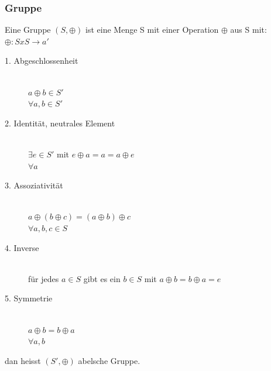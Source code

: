 \documentclass[a4paper,10pt]{article}
\newcommand{\ra}{\rightarrow}
\begin{document}
\subsubsection{Gruppe}
Eine Gruppe $(S,\oplus)$ ist eine Menge S mit einer Operation $\oplus$ aus S mit: $\oplus:SxS \ra a'$
\begin{description}
	\item[1. Abgeschlossenheit] \hfill \\
		$a \oplus b \in S'$ \\ $\forall a,b \in S'$
	\item[2. Identit\"at, neutrales Element] \hfill \\
		$\exists e \in S' $ mit $e \oplus a=a=a\oplus e$ \\ $ \forall a$
	\item[3. Assoziativit\"at] \hfill \\
		$a \oplus (b \oplus c) = (a \oplus b) \oplus c$ \\ $\forall a,b,c \in S$
	\item[4. Inverse] \hfill \\
		f\"ur jedes $a \in S$ gibt es ein $b \in S$ mit $a \oplus b = b \oplus a = e$
	\item[5. Symmetrie] \hfill \\
		$a \oplus b = b \oplus a$ \\ $\forall a,b$
\end{description}
dan heisst $(S', \oplus)$ abelsche Gruppe.
\end{document}

